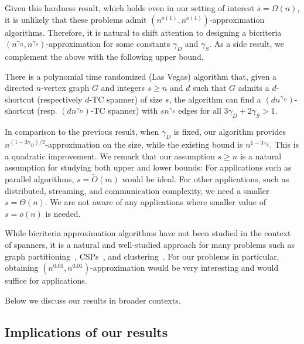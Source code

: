 Given this hardness result, which holds even in our setting of interest $s=\Omega(n)$, it is unlikely that these problems admit $(n^{o(1)}, n^{o(1)})$-approximation algorithms. 
Therefore, it is natural to shift attention to designing a bicriteria $(n^{\gamma_D}, n^{\gamma_S})$-approximation for some constants $\gamma_D$ and $\gamma_S$.   As a side result, we complement the above with the following upper bound. 



\begin{theorem}\label{thm:intro:upperbound}

  There is a polynomial time randomized (Las Vegas) algorithm that, given a directed $n$-vertex graph $G$ and integers $s\geq n$ and $d$ such that $G$ admits a $d$-shortcut (respectively $d$-TC spanner) of size $s$, the algorithm can find a $(d n^{\gamma_D})$-shortcut (resp. $(d n^{\gamma_D})$-TC spanner) with $s n^{\gamma_S}$ edges 
  for all $3\gamma_D + 2\gamma_S >1$.
  

  
	\end{theorem}

 
\noindent

In comparison to the previous result, when $\gamma_D$ is fixed, our algorithm provides $n^{(1-3\gamma_D)/2}$-approximation on the size, while the existing bound is $n^{1-3\gamma_S}$. This is a quadratic improvement. 
We remark that our assumption $s \geq n$ is a natural assumption for studying both upper and lower bounds: For applications such as parallel algorithms, $s=\tilde O(m)$ would be ideal. For other applications, such as distributed, streaming, and communication complexity, we need a smaller $s=\Theta(n)$. We are not aware of any applications where smaller value of $s=o(n)$ is needed. 

While bicriteria approximation  algorithms have not been studied in the context of spanners, it is a natural and well-studied approach for many problems such as graph partitioning~\cite{MakarychevM14}, CSPs~\cite{MakarychevM17}, and clustering~\cite{MakarychevMSW16, AlamdariS17,fox2019embedding}. For our problems in particular, obtaining $(n^{0.01}, n^{0.01})$-approximation would  be very interesting and would suffice for applications. 


Below we discuss our results in broader contexts.





\subsection{Implications of our results}
\label{sec:implications}

